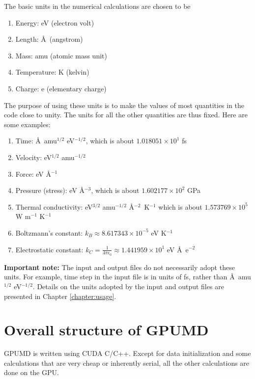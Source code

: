 \documentclass[12pt,a4paper]{report}
\begin{document}
The basic units in the numerical calculations are chosen to be
\begin{enumerate}
\item Energy: eV (electron volt)
\item Length: \AA~(angstrom)
\item Mass: amu (atomic mass unit)
\item Temperature: K (kelvin)
\item Charge: e (elementary charge)
\end{enumerate}
The purpose of using these units is to make the values of most quantities in the code close to unity. The units for all the other quantities are thus fixed. Here are some examples:
\begin{enumerate}
\item Time: \AA~amu$^{1/2}$ eV$^{-1/2}$, which is about $1.018051 \times 10^{1}$ fs
\item Velocity: eV$^{1/2}$ amu$^{-1/2}$
\item Force: eV \AA$^{-1}$
\item Pressure (stress): eV \AA$^{-3}$, which is about $1.602177 \times 10^{2}$ GPa
\item Thermal conductivity: eV$^{3/2}$ amu$^{-1/2}$ \AA$^{-2}$~K$^{-1}$
      which is about $1.573769 \times 10^{5}$ W m$^{-1}$ K$^{-1}$
\item Boltzmann's constant: $k_B \approx 8.617343 \times 10^{-5}$ eV K$^{-1}$
\item Electrostatic constant:
$k_C = \frac{1}{4\pi\epsilon_0} \approx 1.441959 \times 10^{1}$ eV \AA~e$^{-2}$
\end{enumerate}

\textbf{Important note:}
The input and output files do not necessarily adopt these units. For example, time step in the input file is in units of fs, rather than \AA~amu$^{1/2}$ eV$^{-1/2}$. Details on the units adopted by the input and output files are presented in Chapter \ref{chapter:usage}.


\section{Overall structure of GPUMD}

GPUMD is written using CUDA C/C++. Except for data initialization and some calculations that are very cheap or inherently serial, all the other calculations are done on the GPU.
\end{document}
